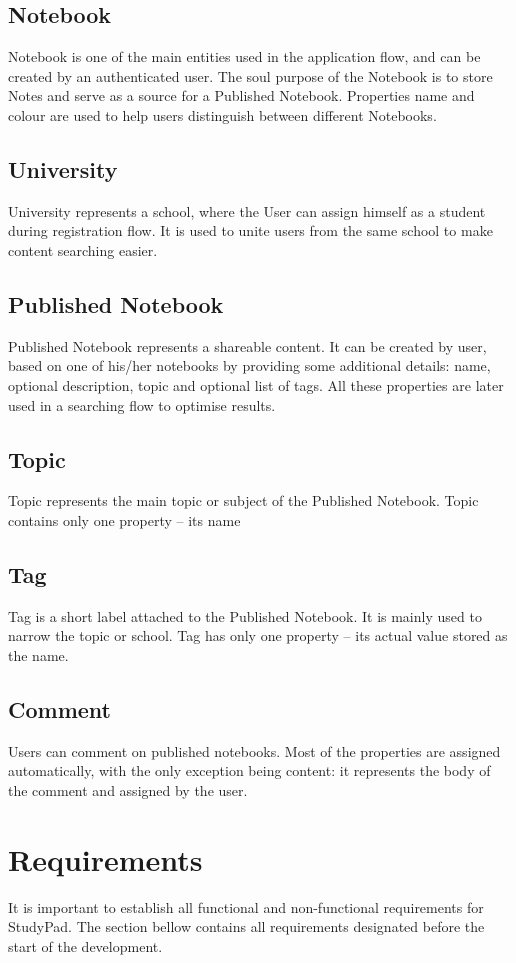 \documentclass[thesis=B,english]{FITthesis}[2012/10/20]
\newcommand{\appname}{StudyPad}
\begin{document}
\subsection{Notebook}
	Notebook is one of the main entities used in the application flow, and  can be created by an authenticated user. The soul purpose of the Notebook is to store Notes and serve as a source for a Published Notebook. Properties name and colour are used to help users distinguish between different Notebooks.
	
	
\subsection{University}
University represents a school, where the User can assign himself as a student during registration flow. It is used to unite users from the same school to make content searching easier. 

\subsection{Published Notebook}
Published Notebook represents a shareable content. It can be created by user, based on one of his/her notebooks by providing some additional details:
name, optional description,  topic and optional list of tags. All these properties are later used in a searching flow to optimise results.

\subsection{Topic}
Topic represents the main topic or subject of the Published Notebook. Topic contains only one property -- its name
\subsection{Tag}
Tag is a short label attached to the Published Notebook. It is mainly  used to narrow the topic or school. Tag has only one property -- its actual value stored as the name.

\subsection{Comment}
Users can comment on published notebooks. Most of the properties are assigned automatically, with the only exception being content: it represents the body of the comment and assigned by the user.


\newpage
\section{Requirements}
It is important to establish all functional and non-functional requirements for \appname. The section bellow contains all requirements designated  before the start of the development.
\end{document}
